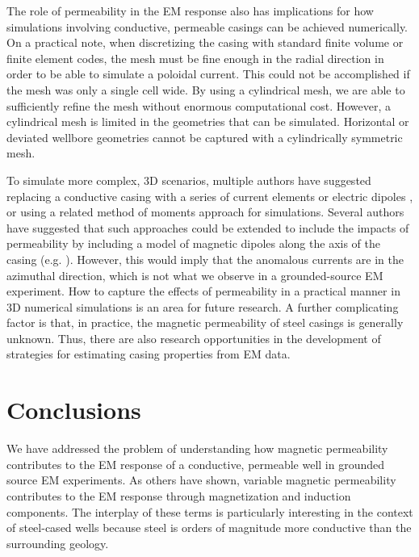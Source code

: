 The role of permeability in the EM response also has implications for how simulations involving conductive, permeable casings can be achieved numerically. On a practical note, when discretizing the casing with standard finite volume or finite element codes, the mesh must be fine enough in the radial direction in order to be able to simulate a poloidal current. This could not be accomplished if the mesh was only a single cell wide. By using a cylindrical mesh, we are able to sufficiently refine the mesh without enormous computational cost. However, a cylindrical mesh is limited in the geometries that can be simulated. Horizontal or deviated wellbore geometries cannot be captured with a cylindrically symmetric mesh.

To simulate more complex, 3D scenarios, multiple authors have suggested replacing a conductive casing with a series of current elements or electric dipoles \citep{cuevas_analytical_2014}, or using a related method of moments approach \citep{kohnke_method_2018, tang_three-dimensional_2015} for simulations. Several authors have suggested that such approaches could be extended to include the impacts of permeability by including a model of magnetic dipoles along the axis of the casing (e.g. \cite{patzer_steel-cased_2017, kohnke_method_2018}). However, this would imply that the anomalous currents are in the azimuthal direction, which is not what we observe in a grounded-source EM experiment. How to capture the effects of permeability in a practical manner in 3D numerical simulations is an area for future research. A further complicating factor is that, in practice, the magnetic permeability of steel casings is generally unknown. Thus, there are also research opportunities in the development of strategies for estimating casing properties from EM data.


\section{Conclusions}
We have addressed the problem of understanding how magnetic permeability contributes to the EM response of a conductive, permeable well in grounded source EM experiments. As others have shown, variable magnetic permeability contributes to the EM response through magnetization and induction components. The interplay of these terms is particularly interesting in the context of steel-cased wells because steel is orders of magnitude more conductive than the surrounding geology.


